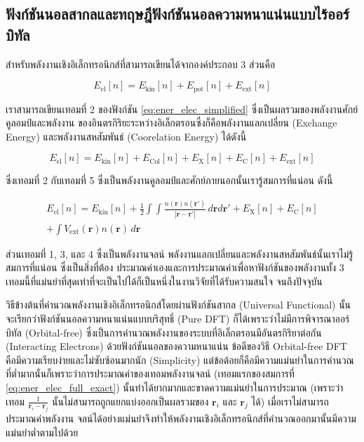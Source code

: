 \subsection{ฟังก์ชันนอลสากลและทฤษฎีฟังก์ชันนอลความหนาแน่นแบบไร้ออร์บิทัล}
\label{ssec:univer_functional}

สำหรับพลังงานเชิงอิเล็กทรอนิกส์ที่สามารถเขียนได้จากองค์ประกอบ 3 ส่วนคือ

\begin{equation}\label{eq:ener_elec_simplified}
    E_{\text{el}}[n] = E_{\text{kin}}[n] + E_{\text{pot}}[n] + E_{\text{ext}}[n]
\end{equation}

\noindent เราสามารถเขียนเทอมที่ 2 ของฟังก์ชัน \ref{eq:ener_elec_simplified} ซึ่งเป็นผลรวมของพลังงานศักย์คูลอมป์และพลังงาน%
ของอินตรกิริยะระหว่างอิเล็กตรอนซึ่งก็คือพลังงานแลกเปลี่ยน (Exchange Energy) และพลังงานสหสัมพันธ์ (Coorelation Energy) ได้ดังนี้

\begin{equation}\label{eq:ener_elec_full}
    E_{\text{el}}[n] = E_{\text{kin}}[n] + E_{\text{Col}}[n] + E_{\text{X}}[n] + E_{\text{C}}[n] + 
    E_{\text{ext}}[n]
\end{equation}

\noindent ซึ่งเทอมที่ 2 กับเทอมที่ 5 ซึ่งเป็นพลังงานคูลอมป์และศักย์ภายนอกนั้นเรารู้สมการที่แน่อน ดังนี้

\begin{multline}\label{eq:ener_elec_full_exact}
    E_{\text{el}}[n] = E_{\text{kin}}[n] + \frac{1}{2} \int \int \frac{n(\bm{r})n(\bm{r'})}{|\bm{r}-\bm{r'}|} 
    \, d\bm{r} d\bm{r'} + E_{\text{X}}[n] + E_{\text{C}}[n] \\ 
    + \int V_{\text{ext}}(\bm{r}) n(\bm{r}) \, d\bm{r}
\end{multline}

\noindent ส่วนเทอมที่ 1, 3, และ 4 ซึ่งเป็นพลังงานจลน์ พลังงานแลกเปลี่ยนและพลังงานสหสัมพันธ์นั้นเราไม่รู้สมการที่แน่อน ซึ่งเป็นสิ่งที่ต้อง%
ประมาณค่าเองและการประมาณค่าเพื่อหาฟังก์ชันของพลังงานทั้ง 3 เทอมนี้ที่แม่นยำที่สุดเท่าที่จะเป็นไปได้ก็เป็นหนึ่งในงานวิจัยที่ได้รับความสนใจ%
จนถึงปัจจุบัน

วิธีข้างต้นที่คำนวณพลังงานเชิงอิเล็กทรอนิกส์โดยผ่านฟังก์ชันสากล (Universal Functional) นั้นจะเรียกว่าฟังก์ชันนอลความหนาแน่นแบบบริสุทธิ์ 
(Pure DFT) ก็ได้เพราะว่าไม่มีการพิจารณาออร์บิทัล (Orbital-free) ซึ่งเป็นการคำนวณพลังงานของระบบที่อิเล็กตรอนมีอันตรกิริยาต่อกัน 
(Interacting Electrons) ด้วยฟังก์ชันนอลของความหนาแน่น ข้อดีของวิธี Orbital-free DFT คือมีความเรียบง่ายและไม่ซับซ้อนมากนัก 
(Simplicity) แต่ข้อด้อยก็คือมีความแม่นยำในการคำนวณที่ต่ำมากนั่นก็เพราะว่าการประมาณค่าของเทอมพลังงานจลน์ (เทอมแรกของสมการที่ 
\ref{eq:ener_elec_full_exact}) นั้นทำได้ยากมากและขาดความแม่นยำในการประมาณ (เพราะว่าเทอม $\frac{1}{\bm{r}_{i} - 
\bm{r}_{j}}$ นั้นไม่สามารถถูกแยกแบ่งออกเป็นผลรวมของ $\bm{r}_{i}$ และ $\bm{r}_{j}$ ได้)  เมื่อเราไม่สามารถประมาณค่าพลังงาน%
จลน์ได้อย่างแม่นยำจึงทำให้พลังงานเชิงอิเล็กทรอนิกส์ที่คำนวณออกมานั้นมีความแม่นยำต่ำตามไปด้วย 

